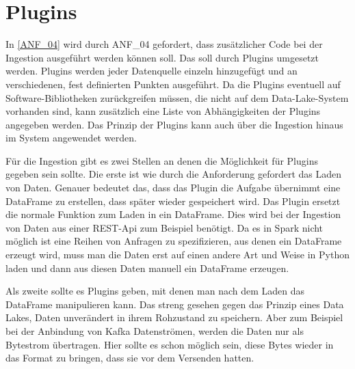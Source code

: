 \section{Plugins}

In \ref{ANF_04} wird durch ANF\_04 gefordert, dass zusätzlicher Code bei der Ingestion ausgeführt werden können soll.
Das soll durch Plugins umgesetzt werden.
Plugins werden jeder Datenquelle einzeln hinzugefügt und an verschiedenen, fest definierten Punkten ausgeführt.
Da die Plugins eventuell auf Software-Bibliotheken zurückgreifen müssen, die nicht auf dem Data-Lake-System vorhanden sind, kann zusätzlich eine Liste von Abhängigkeiten der Plugins angegeben werden.
Das Prinzip der Plugins kann auch über die Ingestion hinaus im System angewendet werden.

Für die Ingestion gibt es zwei Stellen an denen die Möglichkeit für Plugins gegeben sein sollte.
Die erste ist wie durch die Anforderung gefordert das Laden von Daten.
Genauer bedeutet das, dass das Plugin die Aufgabe übernimmt eine DataFrame zu erstellen, dass später wieder gespeichert wird.
Das Plugin ersetzt die normale Funktion zum Laden in ein DataFrame.
Dies wird bei der Ingestion von Daten aus einer REST-Api zum Beispiel benötigt.
Da es in Spark nicht möglich ist eine Reihen von Anfragen zu spezifizieren, aus denen ein DataFrame erzeugt wird, muss man die Daten erst auf einen andere Art und Weise in Python laden und dann aus diesen Daten manuell ein DataFrame erzeugen.

Als zweite sollte es Plugins geben, mit denen man nach dem Laden das DataFrame manipulieren kann.
Das streng gesehen gegen das Prinzip eines Data Lakes, Daten unverändert in ihrem Rohzustand zu speichern.
Aber zum Beispiel bei der Anbindung von Kafka Datenströmen, werden die Daten nur als Bytestrom übertragen.
Hier sollte es schon möglich sein, diese Bytes wieder in das Format zu bringen, dass sie vor dem Versenden hatten.